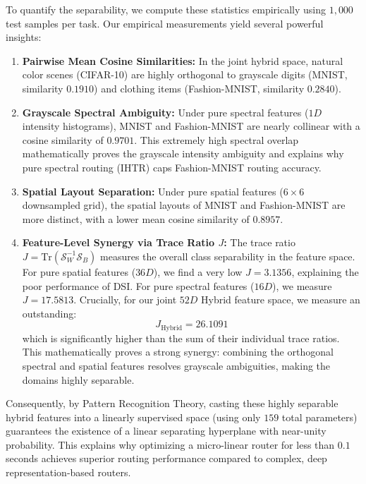 \documentclass{article}
\theoremstyle{plain}
\theoremstyle{definition}
\theoremstyle{remark}
\begin{document}
To quantify the separability, we compute these statistics empirically using $1,000$ test samples per task. Our empirical measurements yield several powerful insights:
\begin{enumerate}
    \item \textbf{Pairwise Mean Cosine Similarities:} In the joint hybrid space, natural color scenes (CIFAR-10) are highly orthogonal to grayscale digits (MNIST, similarity $0.1910$) and clothing items (Fashion-MNIST, similarity $0.2840$).
    \item \textbf{Grayscale Spectral Ambiguity:} Under pure spectral features ($1D$ intensity histograms), MNIST and Fashion-MNIST are nearly collinear with a cosine similarity of $\mathbf{0.9701}$. This extremely high spectral overlap mathematically proves the grayscale intensity ambiguity and explains why pure spectral routing (IHTR) caps Fashion-MNIST routing accuracy.
    \item \textbf{Spatial Layout Separation:} Under pure spatial features ($6\times 6$ downsampled grid), the spatial layouts of MNIST and Fashion-MNIST are more distinct, with a lower mean cosine similarity of $0.8957$.
    \item \textbf{Feature-Level Synergy via Trace Ratio $J$:} The trace ratio $J = \text{Tr} \left( \mathcal{S}_W^{-1} \mathcal{S}_B \right)$ measures the overall class separability in the feature space. For pure spatial features ($36D$), we find a very low $J = 3.1356$, explaining the poor performance of DSI. For pure spectral features ($16D$), we measure $J = 17.5813$. Crucially, for our joint $52D$ Hybrid feature space, we measure an outstanding:
    \begin{equation}
        J_{\text{Hybrid}} = \mathbf{26.1091}
    \end{equation}
    which is significantly higher than the sum of their individual trace ratios. This mathematically proves a strong synergy: combining the orthogonal spectral and spatial features resolves grayscale ambiguities, making the domains highly separable.
\end{enumerate}

Consequently, by Pattern Recognition Theory, casting these highly separable hybrid features into a linearly supervised space (using only $159$ total parameters) guarantees the existence of a linear separating hyperplane with near-unity probability. This explains why optimizing a micro-linear router for less than $0.1$ seconds achieves superior routing performance compared to complex, deep representation-based routers.
\end{document}
